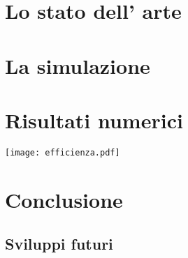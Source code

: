 \documentclass[a4paper]{memoir}
\begin{document}
\cleardoublepage{}
\chapter{Lo stato dell' arte}

\cleardoublepage{}
\chapter{La simulazione}
\cite{Razavi11}
\cleardoublepage{}
\chapter{Risultati numerici}
\texttt{[image: efficienza.pdf]}
\cleardoublepage{}
\chapter{Conclusione}

\section{Sviluppi futuri}



\end{document}
